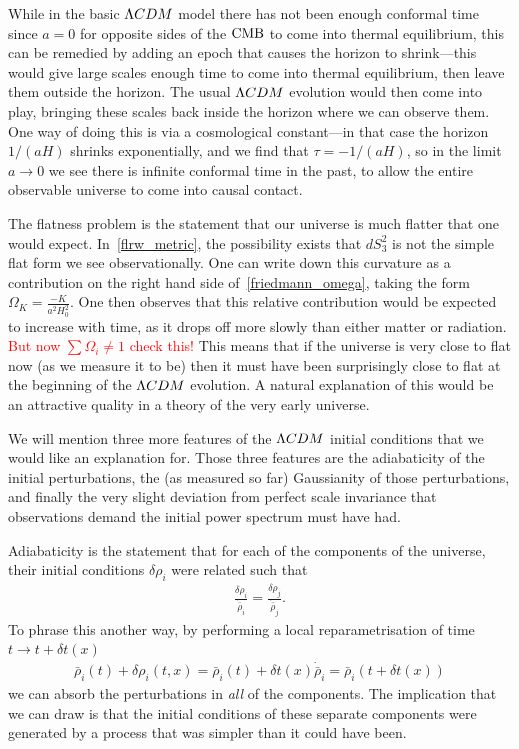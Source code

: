     While in the basic $\Lambda CDM$ model there has not been enough conformal time since $a=0$ for
    opposite sides of the $\text{CMB}$ to come into thermal equilibrium, this can be remedied by
    adding an epoch that causes the horizon to shrink---this would give large scales enough time
    to come into thermal equilibrium, then leave them outside the horizon. The usual $\Lambda CDM$ evolution
    would then come into play, bringing these scales back inside the horizon where we can observe them.
    One way of doing this is via a cosmological constant---in that case the horizon $1/(aH)$ shrinks
    exponentially, and we find that $\tau=-1/(aH)$, so in the limit $a\rightarrow 0$ we see there is
    infinite conformal time in the past, to allow the entire observable universe to come into
    causal contact.


    The flatness problem is the statement that our universe is much flatter that one would expect.
    In~\eqref{flrw_metric}, the possibility exists that $dS_3^2$ is not the simple flat form we
    see observationally.
    One can write down this curvature as a contribution on the right hand side of~\eqref{friedmann_omega},
    taking the form $\Omega_K=\frac{-K}{a^2H_0^2}$.
    One then observes that this relative contribution would be expected to increase with time,
    as it drops off more slowly than either matter or radiation.
    \textcolor{red}{But now $\sum \Omega_i\neq1$ check this!}
    This means that if the universe is very close to flat now (as we measure it to be)
    then it must have been surprisingly close to flat at the beginning of the $\Lambda CDM$
    evolution. A natural explanation of this would be an attractive quality in a
    theory of the very early universe.


    We will mention three more features of the $\Lambda CDM$ initial conditions that we would
    like an explanation for. Those three features are the adiabaticity of the initial
    perturbations, the (as measured so far) Gaussianity of those perturbations, and finally
    the very slight deviation from perfect scale invariance that observations demand the
    initial power spectrum must have had.


    Adiabaticity is the statement that for each of the components of the universe, their
    initial conditions $\delta\rho_i$ were related such that
    \begin{align}
        \frac{\delta\rho_i}{\dot{\bar{\rho}}_i} = \frac{\delta\rho_j}{\dot{\bar{\rho}}_j}.
    \end{align}
    To phrase this another way, by performing a local reparametrisation of time $t\rightarrow t+\delta t(x)$
    \begin{align}
        \bar{\rho}_i(t)+\delta \rho_i(t,x) = \bar{\rho}_i(t)+\delta t(x)\dot{\bar{\rho}}_i
        = \bar{\rho}_i(t+\delta t(x))
    \end{align}
    we can absorb the perturbations in \textit{all} of the components. The implication that we can draw
    is that the initial conditions of these separate components were generated by a process that was simpler than
    it could have been.


